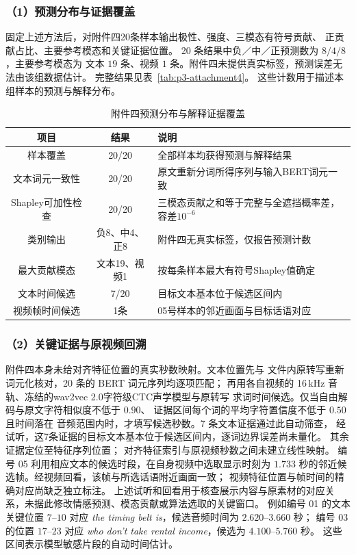 \documentclass[bwprint]{gmcmthesis}
\begin{document}
\subsubsection*{（1）预测分布与证据覆盖}
固定上述方法后，对附件四20条样本输出极性、强度、三模态有符号贡献、
正贡献占比、主要参考模态和关键证据位置。
20 条结果中负／中／正预测数为 $8/4/8$，主要参考模态为
文本 $19$ 条、视频 $1$ 条。附件四未提供真实标签，预测误差无法由该组数据估计。
完整结果见表~\ref{tab:p3-attachment4}。
这些计数用于描述本组样本的预测与解释分布。

\begin{table}[htbp]
 \centering
 \caption{附件四预测分布与解释证据覆盖}
 \label{tab:p3-output-audit}
 \begin{tabularx}{\linewidth}{@{}ccY@{}}
 \toprule
 项目 & 结果 & 说明 \\
 \midrule
 样本覆盖 & 20/20 & 全部样本均获得预测与解释结果 \\
 文本词元一致性 & 20/20 & 原文重新分词所得序列与输入BERT词元一致 \\
 Shapley可加性检查 & 20/20 & 三模态贡献之和等于完整与全遮挡概率差，容差$10^{-6}$ \\
 类别输出 & 负8、中4、正8 & 附件四无真实标签，仅报告预测计数 \\
 最大贡献模态 & 文本19、视频1 & 按每条样本最大有符号Shapley值确定 \\
 文本时间候选 & 7/20 & 目标文本基本位于候选区间内 \\
 视频帧时间候选 & 1条 & 05号样本的邻近画面与目标话语对应 \\
 \bottomrule
 \end{tabularx}
\end{table}

\subsubsection*{（2）关键证据与原视频回溯}
附件四本身未给对齐特征位置的真实秒数映射。文本位置先与
文件内原转写重新词元化核对，20 条的 BERT 词元序列均逐项匹配；
再用各自视频的 16\,kHz 音轨、冻结的wav2vec 2.0字符级CTC声学模型\citep{wav2vec2020}与原转写
求词时间候选。仅当自由解码与原文字符相似度不低于 $0.90$、
证据区间每个词的平均字符置信度不低于 $0.50$ 且时间落在
音频范围内时，才填写候选秒数。7 条文本证据通过此自动筛查，
经试听，这7条证据的目标文本基本位于候选区间内，逐词边界误差尚未量化。
其余证据定位至特征序列位置；
对齐特征索引与原视频秒数之间未建立线性映射。
编号 05 利用相应文本的候选时段，在自身视频中选取显示时刻为
$1.733$ 秒的邻近候选帧。经视频回看，该帧与所选话语附近画面一致；
视频特征位置与帧时间的精确对应尚缺乏独立标注。
上述试听和回看用于核查展示内容与原素材的对应关系，未据此修改情感预测、模态贡献或算法选取的关键窗口。
例如编号 01 的文本关键位置 $7$--$10$ 对应
 \emph{the timing belt is}，候选音频时间为 $2.620$--$3.660$ 秒；
编号 03 的位置 $17$--$23$ 对应
 \emph{who don't take rental income}，候选为 $4.100$--$5.760$ 秒。
这些区间表示模型敏感片段的自动时间估计。
\end{document}
